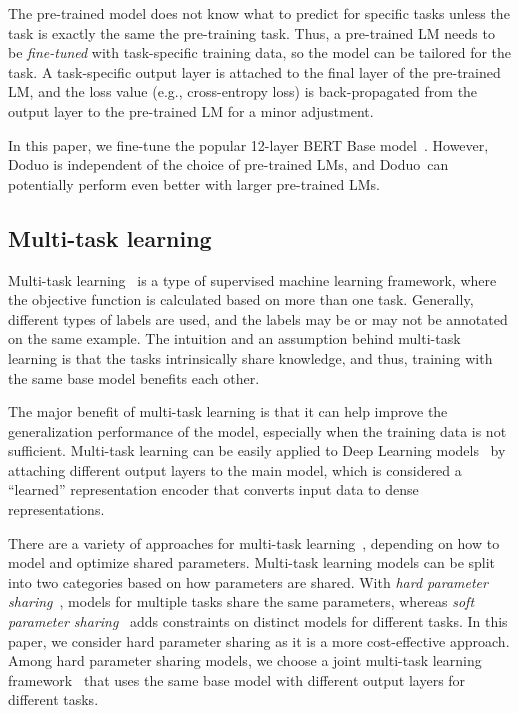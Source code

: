 \documentclass[sigconf]{acmart}
\newcommand{\name}{\mbox{\sc Doduo}}
\begin{document}
The pre-trained model does not know what to predict for specific tasks unless the task is exactly the same the pre-training task. 
%
Thus, a pre-trained LM needs to be {\em fine-tuned} with task-specific training data, so the model can be tailored for the task. 
%
A task-specific output layer is attached to the final layer of the pre-trained LM, and the loss value (e.g., cross-entropy loss) is back-propagated from the output layer to the pre-trained LM for a minor adjustment.

In this paper, we fine-tune the popular 12-layer BERT Base model~\cite{Devlin:2019:BERT}. However, \name{} is independent of the choice of pre-trained LMs, and \name\ can potentially perform even better with larger pre-trained LMs.
%




\subsection{Multi-task learning}
Multi-task learning~\cite{Caruana:2004:MTL} is a type of supervised machine learning framework, where the objective function is calculated based on more than one task. Generally, different types of labels are used, and the labels may be or may not be annotated on the same example. 
%
The intuition and an assumption behind multi-task learning is that the tasks intrinsically share knowledge, and thus, training with the same base model benefits each other. 


The major benefit of multi-task learning is that it can help improve the generalization performance of the model, especially when the training data is not sufficient. 
%
Multi-task learning can be easily applied to Deep Learning models~\cite{Ruder:2017:MTLOverview} by attaching different output layers to the main model, which is considered a ``learned'' representation encoder that converts input data to dense representations.

There are a variety of approaches for multi-task learning~\cite{Ruder:2017:MTLOverview}, depending on how to model and optimize shared parameters. 
%
Multi-task learning models can be split into two categories based on how parameters are shared. With {\em hard parameter sharing}~\cite{Caruana:1993:MTLHardParameterSharing}, models for multiple tasks share the same parameters, whereas {\em soft parameter sharing}~\cite{Yang:2017:ICLR:MTLSoftParameterSharing} adds constraints on distinct models for different tasks. 
%
In this paper, we consider hard parameter sharing as it is a more cost-effective approach. Among hard parameter sharing models, we choose a joint multi-task learning framework~\cite{Hashimoto:2017:EMNLP:JointMTL} that uses the same base model with different output layers for different tasks. 
\end{document}

